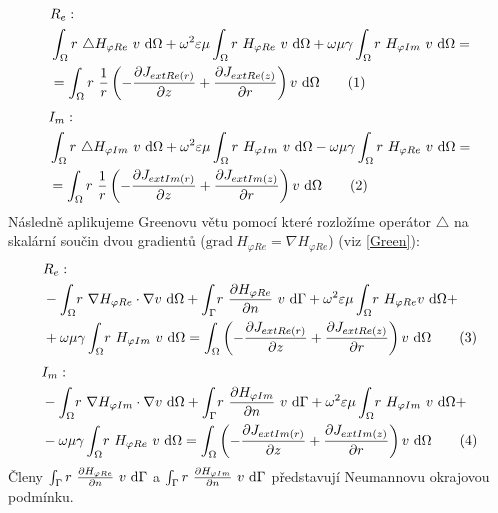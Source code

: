 \documentclass[12pt,a4paper,oneside]{article}
\numberwithin{equation}{section} %
\numberwithin{figure}{section} %
\numberwithin{table}{section} %
\newcommand{\grad}{\mathrm{grad}\ }
\newcommand\numberthis{\addtocounter{equation}{1}\tag{\theequation}}
\begin{document}
\begin{align*}
&R_e:
\\
&\int _{\Omega} r ~ \triangle H _{\varphi Re} ~ v ~ \ud \Omega + \omega ^2 \varepsilon \mu \int _{\Omega} r ~ H _{\varphi Re} ~ v ~ \ud \Omega + \omega \mu \gamma \int _{\Omega} r ~ H _{\varphi Im} ~ v ~ \ud \Omega = 
\\
&= \int _{\Omega} r ~ \frac{1}{r} \left( - \frac{\partial J _{extRe(r)}}{\partial z} + \frac{\partial J _{extRe(z)}}{\partial r} \right) v ~ \ud \Omega
\numberthis
\end{align*}
\begin{align*}
&I_m:
\\
&\int _{\Omega} r ~ \triangle H _{\varphi Im} ~ v ~ \ud \Omega + \omega ^2 \varepsilon \mu \int _{\Omega} r ~ H _{\varphi Im} ~ v ~ \ud \Omega - \omega \mu \gamma \int _{\Omega} r ~ H _{\varphi Re} ~ v ~ \ud \Omega = 
\\
&= \int _{\Omega} r ~ \frac{1}{r} \left( - \frac{\partial J _{extIm(r)}}{\partial z} + \frac{\partial J _{extIm(z)}}{\partial r} \right) v ~ \ud \Omega
\numberthis
\end{align*}
Následně aplikujeme Greenovu větu pomocí které rozložíme operátor $\triangle$ na skalární součin dvou gradientů ($\grad H _{\varphi Re} = \nabla H _{\varphi Re}$) (viz \ref{Green}):
\begin{align*}
&R_e:
\\
&- \int _{\Omega} \! r ~ \nabla H _{\varphi Re} \cdot \nabla v ~ \ud \Omega + \int _{\Gamma} \! r ~ \frac{\partial H _{\varphi Re}}{\partial n} ~ v ~ \ud \Gamma + \omega ^2 \varepsilon \mu \int _{\Omega} \! r ~ H _{\varphi Re} v ~ \ud \Omega +\\
& + \omega \mu \gamma \int _{\Omega} \! r ~ H _{\varphi Im} ~ v ~ \ud \Omega = \int _{\Omega} \left( - \frac{\partial J _{extRe(r)}}{\partial z} + \frac{\partial J _{extRe(z)}}{\partial r} \right) v ~ \ud \Omega
\numberthis
\end{align*}
\begin{align*}
&I_m:
\\
&- \int _{\Omega} \! r ~ \nabla H _{\varphi Im} \cdot \nabla v ~ \ud \Omega + \int _{\Gamma} \! r ~ \frac{\partial H _{\varphi Im}}{\partial n} ~ v ~ \ud \Gamma + \omega ^2 \varepsilon \mu \int _{\Omega} \! r ~ H _{\varphi Im} ~ v ~ \ud \Omega +\\
& - \omega \mu \gamma \int _{\Omega} \! r ~ H _{\varphi Re} ~ v ~ \ud \Omega = \int _{\Omega} \left( - \frac{\partial J _{extIm(r)}}{\partial z} + \frac{\partial J _{extIm(z)}}{\partial r} \right) v ~ \ud \Omega
\numberthis
\end{align*}
Členy $\int _{\Gamma} r ~ \frac{\partial H _{\varphi Re}}{\partial n} ~ v ~ \mathrm{d} \Gamma$ a $\int _{\Gamma} r ~ \frac{\partial H _{\varphi Im}}{\partial n} ~ v ~ \mathrm{d} \Gamma$ představují Neumannovu okrajovou podmínku.
\end{document}
